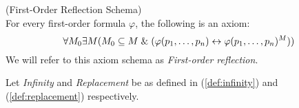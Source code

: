 \begin{definition}{(First-Order Reflection Schema)}\label{def:first_order_reflection}\\ %
For every first-order formula $\varphi$, the following is an axiom:
\begin{equation}
\forall M_0 \exists M (M_0 \subseteq M \et (\varphi(p_1, \ldots, p_n) \iff \varphi(p_1, \ldots, p_n)^M)) %
\end{equation}
We will refer to this axiom schema as \emph{First-order reflection}.
\end{definition}



Let \emph{Infinity} and \emph{Replacement} be as defined in (\ref{def:infinity}) and (\ref{def:replacement}) respectively.

